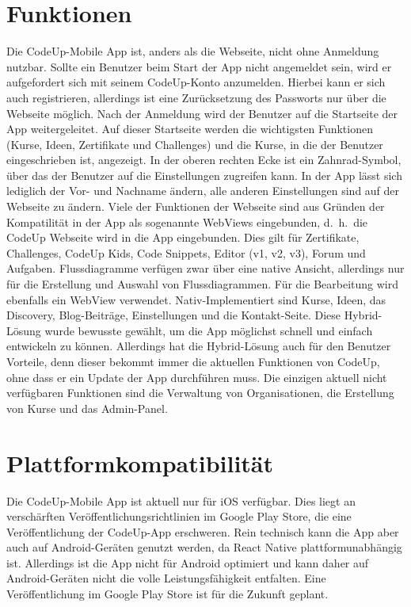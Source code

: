 \documentclass[main.tex]{subfiles}
\begin{document}
    \section{Funktionen}
    Die CodeUp-Mobile App ist, anders als die Webseite, nicht ohne Anmeldung nutzbar.
    Sollte ein Benutzer beim Start der App nicht angemeldet sein, wird er aufgefordert sich mit seinem CodeUp-Konto anzumelden.
    Hierbei kann er sich auch registrieren, allerdings ist eine Zurücksetzung des Passworts nur über die Webseite möglich.
    Nach der Anmeldung wird der Benutzer auf die Startseite der App weitergeleitet.
    Auf dieser Startseite werden die wichtigsten Funktionen (Kurse, Ideen, Zertifikate und Challenges) und die Kurse, in die der Benutzer eingeschrieben ist, angezeigt.
    In der oberen rechten Ecke ist ein Zahnrad-Symbol, über das der Benutzer auf die Einstellungen zugreifen kann.
    In der App lässt sich lediglich der Vor- und Nachname ändern, alle anderen Einstellungen sind auf der Webseite zu ändern.
    Viele der Funktionen der Webseite sind aus Gründen der Kompatilität in der App als sogenannte WebViews eingebunden, d.~h.~die CodeUp Webseite wird in die App eingebunden.
    Dies gilt für Zertifikate, Challenges, CodeUp Kids, Code Snippets, Editor (v1, v2, v3), Forum und Aufgaben.
    Flussdiagramme verfügen zwar über eine native Ansicht, allerdings nur für die Erstellung und Auswahl von Flussdiagrammen.
    Für die Bearbeitung wird ebenfalls ein WebView verwendet.
    Nativ-Implementiert sind Kurse, Ideen, das Discovery, Blog-Beiträge, Einstellungen und die Kontakt-Seite.
    Diese Hybrid-Lösung wurde bewusste gewählt, um die App möglichst schnell und einfach entwickeln zu können.
    Allerdings hat die Hybrid-Lösung auch für den Benutzer Vorteile, denn dieser bekommt immer die aktuellen Funktionen von CodeUp, ohne dass er ein Update der App durchführen muss.
    Die einzigen aktuell nicht verfügbaren Funktionen sind die Verwaltung von Organisationen, die Erstellung von Kurse und das Admin-Panel.
    \section{Plattformkompatibilität}
    Die CodeUp-Mobile App ist aktuell nur für iOS verfügbar.
    Dies liegt an verschärften Veröffentlichungsrichtlinien im Google Play Store, die eine Veröffentlichung der CodeUp-App erschweren.
    Rein technisch kann die App aber auch auf Android-Geräten genutzt werden, da React Native plattformunabhängig ist.
    Allerdings ist die App nicht für Android optimiert und kann daher auf Android-Geräten nicht die volle Leistungsfähigkeit entfalten.
    Eine Veröffentlichung im Google Play Store ist für die Zukunft geplant.
\end{document}

